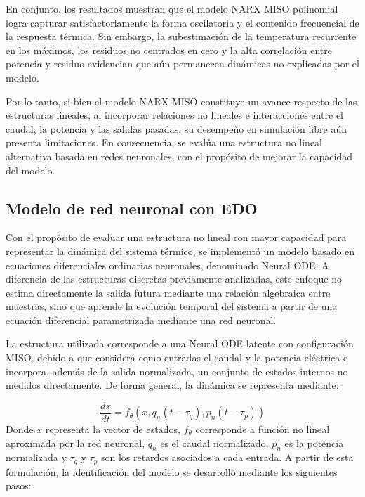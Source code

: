 \documentclass[11pt]{report}
\begin{document}
En conjunto, los resultados muestran que el modelo NARX MISO polinomial logra capturar satisfactoriamente la forma oscilatoria y el contenido frecuencial de la respuesta térmica. Sin embargo, la subestimación de la temperatura recurrente en los máximos, los residuos no centrados en cero y la alta correlación entre potencia y residuo evidencian que aún permanecen dinámicas no explicadas por el modelo.

Por lo tanto, si bien el modelo NARX MISO constituye un avance respecto de las estructuras lineales, al incorporar relaciones no lineales e interacciones entre el caudal, la potencia y las salidas pasadas, su desempeño en simulación libre aún presenta limitaciones. En consecuencia, se evalúa una estructura no lineal alternativa basada en redes neuronales, con el propósito de mejorar la capacidad del modelo.


\subsection{Modelo de red neuronal con EDO}

Con el propósito de evaluar una estructura no lineal con mayor capacidad para representar la dinámica del sistema térmico, se implementó un modelo basado en ecuaciones diferenciales ordinarias neuronales, denominado Neural ODE. A diferencia de las estructuras discretas previamente analizadas, este enfoque no estima directamente la salida futura mediante una relación algebraica entre muestras, sino que aprende la evolución temporal del sistema a partir de una ecuación diferencial parametrizada mediante una red neuronal.

La estructura utilizada corresponde a una Neural ODE latente con configuración MISO, debido a que considera como entradas el caudal y la potencia eléctrica e incorpora, además de la salida normalizada, un conjunto de estados internos no medidos directamente. De forma general, la dinámica se representa mediante:


$$\frac{dx}{dt}=f_{\theta}(x,q_n(t-\tau_q),p_n(t-\tau_p))$$
Donde $x$ representa la vector de estados, $f_{\theta}$ corresponde a función no lineal aproximada por la red neuronal, $q_n$ es el caudal normalizado, $p_n$ es la potencia normalizada y $\tau_q$ y $\tau_p$ son los retardos asociados a cada entrada. A partir de esta formulación, la identificación del modelo se desarrolló mediante los siguientes pasos:
\end{document}
